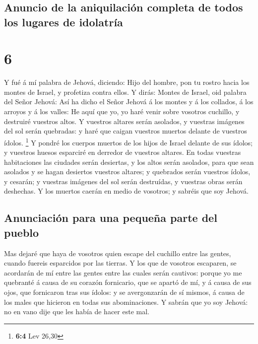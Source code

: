 \hypertarget{anuncio-de-la-aniquilaciuxf3n-completa-de-todos-los-lugares-de-idolatruxeda}{%
\subsection{Anuncio de la aniquilación completa de todos los lugares de
idolatría}\label{anuncio-de-la-aniquilaciuxf3n-completa-de-todos-los-lugares-de-idolatruxeda}}

\hypertarget{section-5}{%
\section{6}\label{section-5}}

 Y fué á mí palabra de Jehová, diciendo: 
Hijo del hombre, pon tu rostro hacia los montes de Israel, y profetiza
contra ellos.  Y dirás: Montes de Israel, oid palabra del
Señor Jehová: Así ha dicho el Señor Jehová á los montes y á los
collados, á los arroyos y á los valles: He aquí que yo, yo haré venir
sobre vosotros cuchillo, y destruiré vuestros altos.  Y
vuestros altares serán asolados, y vuestras imágenes del sol serán
quebradas: y haré que caigan vuestros muertos delante de vuestros
ídolos. \footnote{\textbf{6:4} Lev 26,30}  Y pondré los
cuerpos muertos de los hijos de Israel delante de sus ídolos; y vuestros
huesos esparciré en derredor de vuestros altares.  En
todas vuestras habitaciones las ciudades serán desiertas, y los altos
serán asolados, para que sean asolados y se hagan desiertos vuestros
altares; y quebrados serán vuestros ídolos, y cesarán; y vuestras
imágenes del sol serán destruídas, y vuestras obras serán deshechas.
 Y los muertos caerán en medio de vosotros; y sabréis que
soy Jehová.

\hypertarget{anunciaciuxf3n-para-una-pequeuxf1a-parte-del-pueblo}{%
\subsection{Anunciación para una pequeña parte del
pueblo}\label{anunciaciuxf3n-para-una-pequeuxf1a-parte-del-pueblo}}

 Mas dejaré que haya de vosotros quien escape del cuchillo
entre las gentes, cuando fuereis esparcidos por las tierras.
 Y los que de vosotros escaparen, se acordarán de mí entre
las gentes entre las cuales serán cautivos: porque yo me quebranté á
causa de su corazón fornicario, que se apartó de mí, y á causa de sus
ojos, que fornicaron tras sus ídolos: y se avergonzarán de sí mismos, á
causa de los males que hicieron en todas sus abominaciones.
 Y sabrán que yo soy Jehová: no en vano dije que les
había de hacer este mal.

